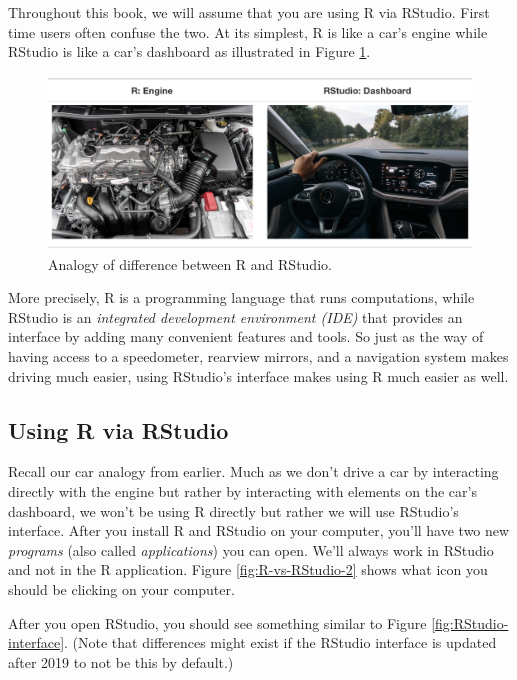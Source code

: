 \documentclass[]{book}
\begin{document}
Throughout this book, we will assume that you are using R via RStudio. First time users often confuse the two. At its simplest, R is like a car's engine while RStudio is like a car's dashboard as illustrated in Figure \ref{fig:R-vs-RStudio-1}.

\begin{figure}

{\centering \includegraphics[width=0.95\linewidth]{images/shutterstock/R_vs_RStudio_1} 

}

\caption{Analogy of difference between R and RStudio.}\label{fig:R-vs-RStudio-1}
\end{figure}

More precisely, R is a programming language that runs computations, while RStudio is an \emph{integrated development environment (IDE)} that provides an interface by adding many convenient features and tools. So just as the way of having access to a speedometer, rearview mirrors, and a navigation system makes driving much easier, using RStudio's interface makes using R much easier as well.

\hypertarget{using-r-via-rstudio}{%
\subsection{Using R via RStudio}\label{using-r-via-rstudio}}

Recall our car analogy from earlier. Much as we don't drive a car by interacting directly with the engine but rather by interacting with elements on the car's dashboard, we won't be using R directly but rather we will use RStudio's interface. After you install R and RStudio on your computer, you'll have two new \emph{programs} (also called \emph{applications}) you can open. We'll always work in RStudio and not in the R application. Figure \ref{fig:R-vs-RStudio-2} shows what icon you should be clicking on your computer.

After you open RStudio, you should see something similar to Figure \ref{fig:RStudio-interface}. (Note that differences might exist if the RStudio interface is updated after 2019 to not be this by default.)
\end{document}
